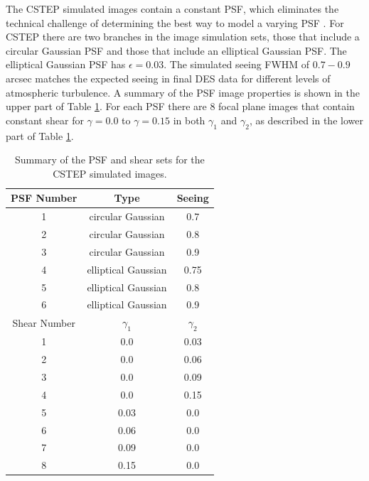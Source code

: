  The CSTEP simulated images contain a constant
PSF, which eliminates the technical challenge of determining the best
way to model a varying PSF \citep[cf.][for a simulation challenge for PSF reconstruction]{GREAT10star}. For CSTEP there are two
branches in the image simulation sets, those that include a circular
Gaussian PSF and those that include an elliptical Gaussian PSF. 
The elliptical Gaussian PSF has $ \epsilon =
0.03 $. The simulated seeing FWHM of $ 0.7 - 0.9 $ arcsec matches the expected seeing in final DES data for different levels of atmospheric turbulence.
A summary of the PSF image properties is shown in the upper part of Table \ref{table:tab2}. 
For each PSF there are 8 focal plane images that contain constant
shear for $\gamma = 0.0$ to $\gamma = 0.15$ in both
$\gamma_1$ and $\gamma_2$, as described in the lower part of Table \ref{table:tab2}.  
\begin{table}
\centering
\begin{centering}
\begin{tabular}{ccc}
\hline
PSF Number & Type & Seeing  \\
\hline
1 & circular Gaussian & 0.7 \\
2 & circular Gaussian & 0.8 \\
3 & circular Gaussian & 0.9 \\
4 & elliptical Gaussian & 0.75 \\
5 & elliptical Gaussian & 0.8  \\
6 & elliptical Gaussian & 0.9  \\
\hline
\hline
Shear Number & $ \gamma_1 $ & $ \gamma_2 $  \\
\hline
1 &  0.0 & 0.03 \\
2 &  0.0 & 0.06 \\
3 &  0.0 & 0.09 \\
4 &  0.0 & 0.15 \\
5 &  0.03 & 0.0 \\
6 &  0.06 & 0.0 \\
7 &  0.09 & 0.0 \\
8 &  0.15 & 0.0 \\
\hline
\end{tabular}
\end{centering}
\caption{ Summary of the PSF and shear sets for the CSTEP simulated images. }
\label{table:tab2}
\end{table}
